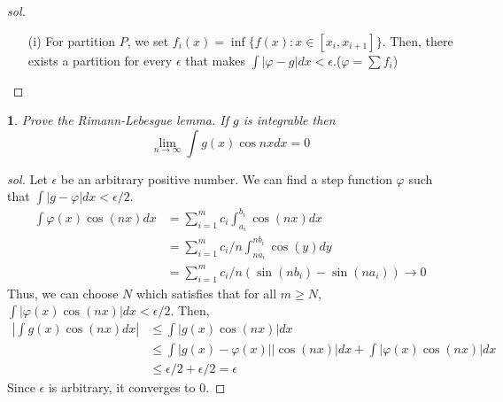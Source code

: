 \documentclass{report}
\newtheorem{ex}{}[section]
\begin{document}
\begin{proof}[sol]~
\begin{enumerate}
    \item[(i)] For partition $P$, we set $f_i(x) = \inf\{f(x) :x \in [x_i, x_{i+1}]\}$. Then, there exists a partition for every $\epsilon$ that makes $\int|\varphi - g|dx < \epsilon$.($\varphi = \sum f_i$)
\end{enumerate}
\end{proof}
\begin{ex}
Prove the Rimann-Lebesgue lemma. If $g$ is integrable then
\[\lim_{n\to\infty} \int g(x) \cos nx dx  = 0\]
\end{ex}
\begin{proof}[sol]
Let $\epsilon$ be an arbitrary positive number. We can find a step function $\varphi$ such that $\int |g - \varphi|dx < \epsilon / 2$.
\begin{align*}
    \int \varphi(x)\cos(nx)dx &= \sum_{i=1}^m c_i\int_{a_i}^{b_i}\cos(nx)dx\\
    &= \sum_{i=1}^m c_i/n\int_{na_i}^{nb_i}\cos(y)dy\\
    &= \sum_{i=1}^m c_i/n(\sin(nb_i) -\sin(na_i)) \to 0
\end{align*}
Thus, we can choose $N$ which satisfies that for all $m \ge N$, $\int|\varphi(x)\cos(nx)|dx < \epsilon/2$. Then,
\begin{align*}
    |\int g(x)\cos(nx)dx| &\le \int|g(x)\cos(nx)|dx\\
    &\le \int|g(x)-\varphi(x)||\cos(nx)|dx + \int|\varphi(x)\cos(nx)|dx\\
    &\le \epsilon/2 + \epsilon/2 = \epsilon
\end{align*}
Since $\epsilon$ is arbitrary, it converges to 0.
\end{proof}
\end{document}
